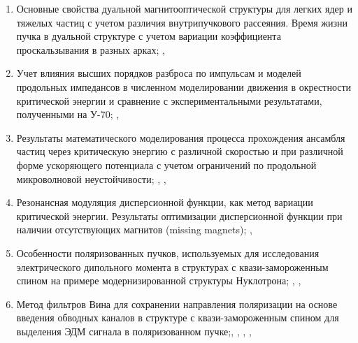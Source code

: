 \par {}
\begin{enumerate}[beginpenalty=10000] %
  \item 	Основные свойства дуальной магнитооптической структуры для легких ядер и тяжелых частиц с учетом различия внутрипучкового рассеяния. Время жизни пучка в дуальной структуре с учетом вариации коэффициента проскальзывания в разных арках; \cite{Kolokolchikov:2025_dual}, \cite{Syresin:2021_polar}
  \item	Учет влияния высших порядков разброса по импульсам и моделей продольных импедансов в численном моделировании движения в окрестности критической энергии и сравнение с экспериментальными результатами, полученными на У-70; \cite{Kolokolchikov:2025_U70}, \cite{Kolokolchikov:2025_jump}
  \item	Результаты математического моделирования процесса прохождения ансамбля частиц через критическую энергию с различной скоростью и при различной форме ускоряющего потенциала с учетом ограничений по продольной микроволновой неустойчивости; \cite{Kolokolchikov:2024_bb_rupac}, \cite{Kolokolchikov:2023_bb_IPAC}, \cite{Kolokolchikov:2024_bb_dspin}
  \item	Резонансная модуляция дисперсионной функции, как метод вариации критической энергии. Результаты оптимизации дисперсионной функции при наличии отсутствующих магнитов (missing magnets); \cite{Kolokolchikov:2021trans}, \cite{Kolokolchikov:2023_pecular}
  \item	Особенности поляризованных пучков, используемых для исследования электрического дипольного момента в структурах с квази-замороженным спином на примере модернизированной структуры Нуклотрона; \cite{Senichev:2023_QFS}, \cite{Senichev:2023_nuclotron}, \cite{Kolokolchikov:2025_nuclotron}
  \item	Метод фильтров Вина для сохранении направления поляризации  на основе введения обводных каналов в структуре с квази-замороженным спином для выделения ЭДМ сигнала в поляризованном пучке;\cite{Kolokolchikov:2023_bypass}, \cite{Kolokolchikov:2023_bypass_IPAC}, \cite{Senichev:2024_nica_edm}, \cite{Kolokolchikov:2023_sc}, \cite{Kolokolchikov:2023_sc_IPAC}
\end{enumerate}

